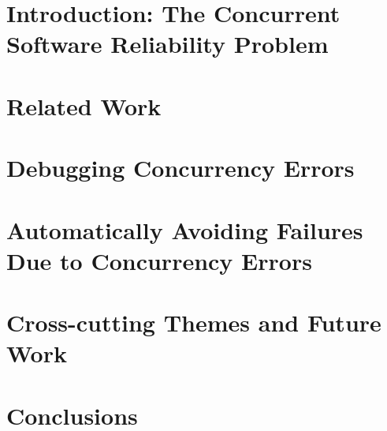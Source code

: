 \documentclass [11pt, twoside] {uwthesis}[2012/06/19]
\begin{document}
 
 
\textpages
 
\chapter {Introduction: The Concurrent Software Reliability Problem}


\chapter{Related Work}

 
\chapter{Debugging Concurrency Errors}


\chapter{Automatically Avoiding Failures Due to Concurrency Errors}


\chapter{Cross-cutting Themes and Future Work}


\chapter{Conclusions}

\end{document}
